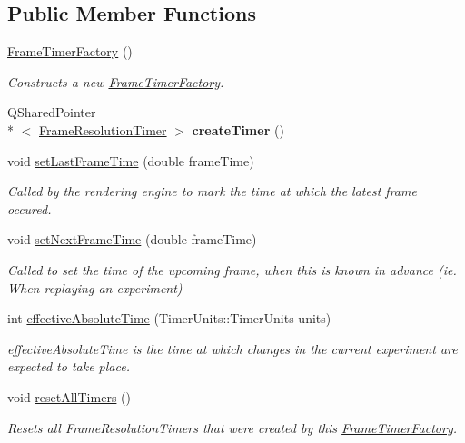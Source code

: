 \subsection*{Public Member Functions}
\begin{DoxyCompactItemize}
\item 
\hyperlink{class_picto_1_1_controller_1_1_frame_timer_factory_a01bf2951e8420e507d62620dad7c8cb7}{Frame\-Timer\-Factory} ()
\begin{DoxyCompactList}\small\item\em Constructs a new \hyperlink{class_picto_1_1_controller_1_1_frame_timer_factory}{Frame\-Timer\-Factory}. \end{DoxyCompactList}\item 
\hypertarget{class_picto_1_1_controller_1_1_frame_timer_factory_ae4e28c03f1435682a5d24ed672bfcb6c}{Q\-Shared\-Pointer\\*
$<$ \hyperlink{class_picto_1_1_controller_1_1_frame_resolution_timer}{Frame\-Resolution\-Timer} $>$ {\bfseries create\-Timer} ()}\label{class_picto_1_1_controller_1_1_frame_timer_factory_ae4e28c03f1435682a5d24ed672bfcb6c}

\item 
void \hyperlink{class_picto_1_1_controller_1_1_frame_timer_factory_a48b482038330b609b0cf18be2e415b96}{set\-Last\-Frame\-Time} (double frame\-Time)
\begin{DoxyCompactList}\small\item\em Called by the rendering engine to mark the time at which the latest frame occured. \end{DoxyCompactList}\item 
void \hyperlink{class_picto_1_1_controller_1_1_frame_timer_factory_ab94d0e1bc28b824dc4371a705d186d6e}{set\-Next\-Frame\-Time} (double frame\-Time)
\begin{DoxyCompactList}\small\item\em Called to set the time of the upcoming frame, when this is known in advance (ie. When replaying an experiment) \end{DoxyCompactList}\item 
int \hyperlink{class_picto_1_1_controller_1_1_frame_timer_factory_a513187b8cad30b19cd6957862523cb84}{effective\-Absolute\-Time} (Timer\-Units\-::\-Timer\-Units units)
\begin{DoxyCompactList}\small\item\em effective\-Absolute\-Time is the time at which changes in the current experiment are expected to take place. \end{DoxyCompactList}\item 
void \hyperlink{class_picto_1_1_controller_1_1_frame_timer_factory_a2855b0073d525a2b4a7eb4c4ed2db2fd}{reset\-All\-Timers} ()
\begin{DoxyCompactList}\small\item\em Resets all Frame\-Resolution\-Timers that were created by this \hyperlink{class_picto_1_1_controller_1_1_frame_timer_factory}{Frame\-Timer\-Factory}. \end{DoxyCompactList}\end{DoxyCompactItemize}
